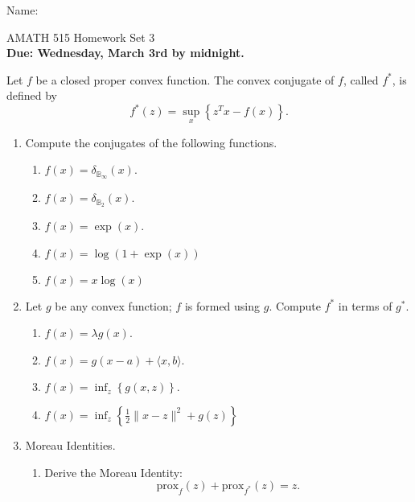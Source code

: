 \documentclass[11pt]{amsart}
\begin{document}
{\Large Name:}  \\
\begin{center}
\Large AMATH 515 \hskip 2in Homework Set 3\\
{\bf Due: Wednesday, March 3rd by midnight.}
\end{center}
\bigskip

Let $f$ be a closed proper convex function. The convex conjugate of $f$, called $f^*$, is defined by 
\[
f^*(z) = \sup_x \left\{ z^Tx - f(x)\right\}.
\]


\begin{enumerate}



\item  Compute the conjugates of the following functions.  
\begin{enumerate}
\item $f(x) = \delta_{\mathbb{B}_{\infty}}(x)$.
\item $f(x) = \delta_{\mathbb{B}_{2}}(x)$.
\item $f(x) = \exp(x)$.
\item $f(x) =  \log(1+\exp(x))$
\item $f(x) = x\log(x)$
\end{enumerate}


\bigskip\bigskip



\item  Let $g$ be any convex function; $f$ is formed using $g$.
Compute $f^*$ in terms of $g^*$.  
\begin{enumerate}
\item $f(x) = \lambda g(x)$.
\item $f(x) = g(x-a) + \langle x, b \rangle$.
\item $f(x) = \inf_z \left\{g(x,z)\right\}$. 
\item $f(x) = \inf_z \left\{\frac{1}{2}\|x-z\|^2 + g(z)\right\}$
\end{enumerate}

\bigskip\bigskip

\item Moreau Identities.
\begin{enumerate}
\item  Derive the Moreau Identity: 
\[
\mbox{prox}_{f}(z) + \mbox{prox}_{f^*}(z) = z. 
\]


\bigskip \bigskip



\end{enumerate}
\end{enumerate}
\end{document}
